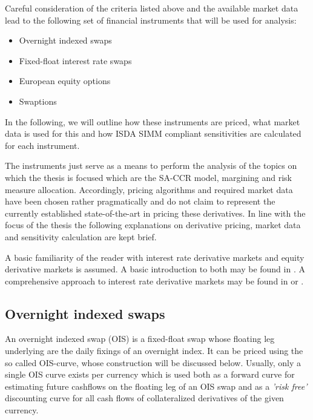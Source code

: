 \documentclass[../Thesis_AHoecherl.tex]{subfiles}
\begin{document}
    Careful consideration of the criteria listed above and the available market data lead to the following set of financial instruments that will be used for analysis:

    \begin{itemize}
        \item Overnight indexed swaps
        \item Fixed-float interest rate swaps
        \item European equity options
        \item Swaptions
    \end{itemize}

    In the following, we will outline how these instruments are priced, what market data is used for this and how \gls{ISDA SIMM} compliant sensitivities are calculated for each instrument.

    The instruments just serve as a means to perform the analysis of the topics on which the thesis is focused which are the \gls{SA-CCR} model, margining and risk measure allocation.
    Accordingly, pricing algorithms and required market data have been chosen rather pragmatically and do not claim to represent the currently established state-of-the-art in pricing these derivatives.
    In line with the focus of the thesis the following explanations on derivative pricing, market data and sensitivity calculation are kept brief.  

    A basic familiarity of the reader with interest rate derivative markets and equity derivative markets is assumed. 
    A basic introduction to both may be found in \cite{hull2009options}. A comprehensive approach to interest rate derivative markets may be found in \cite{brigo2007interest} or \cite{andersen2010interest}.

    \subsection{Overnight indexed swaps}\label{sec:Overnight indexed swap}

    An overnight indexed swap (\gls{OIS}) is a fixed-float swap whose floating leg underlying are the daily fixings of an overnight index.
    It can be priced using the so called \gls{OIS}-curve, whose construction will be discussed below.
    Usually, only a single \gls{OIS} curve exists per currency which is used both as a forward curve for estimating future cashflows on the floating leg of an OIS swap and as a \emph{'risk free'} discounting curve for all cash flows of collateralized derivatives of the given currency.
\end{document}
